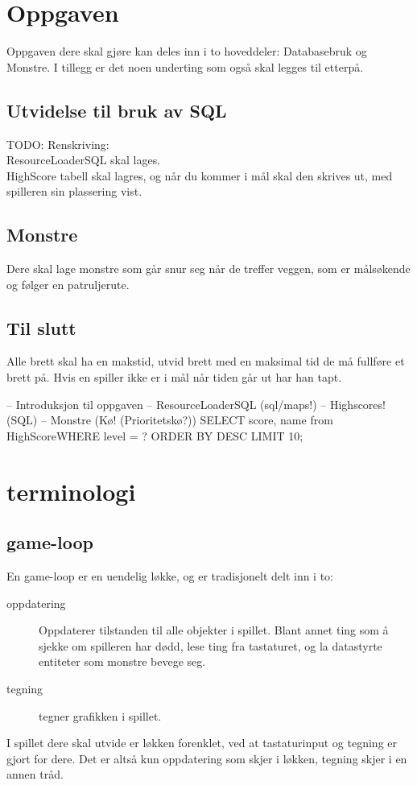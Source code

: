 \documentclass{article}
\begin{document}
\section{Oppgaven}
Oppgaven dere skal gjøre kan deles inn i to hoveddeler: Databasebruk og Monstre. I tillegg er det noen underting som også skal legges til etterpå.
\subsection{Utvidelse til bruk av SQL}
\label{subsec:sqloppgave}
TODO: Renskriving: \\
ResourceLoaderSQL skal lages. \\
HighScore tabell skal lagres, og når du kommer i mål skal den skrives ut, med spilleren sin plassering vist. \\

\subsection{Monstre}
\label{subsec:monsteroppgave}
Dere skal lage monstre som går snur seg når de treffer veggen, som er målsøkende og følger en patruljerute.

\subsection{Til slutt}
\label{subsec:ekstra}
Alle brett skal ha en makstid, utvid brett med en maksimal tid de må fullføre et brett på. Hvis en spiller ikke er i mål når tiden går ut har han tapt.


-- Introduksjon til oppgaven
-- ResourceLoaderSQL (sql/maps!)
-- Highscores! (SQL)
-- Monstre (Kø! (Prioritetskø?))
SELECT score, name from HighScoreWHERE level = ? ORDER BY DESC LIMIT 10;

\section{terminologi}
\subsection{game-loop}
\label{subsec:game-loop}
En game-loop er en uendelig løkke, og er tradisjonelt delt inn i to:
\begin{description}
\item [oppdatering] Oppdaterer tilstanden til alle objekter i spillet. Blant annet ting som å sjekke om spilleren har dødd, lese ting fra tastaturet, og la datastyrte entiteter som monstre bevege seg.
\item [tegning] tegner grafikken i spillet.
\end{description}
I spillet dere skal utvide er løkken forenklet, ved at tastaturinput og tegning er gjort for dere.
Det er altså kun oppdatering som skjer i løkken, tegning skjer i en annen tråd.
\end{document}

